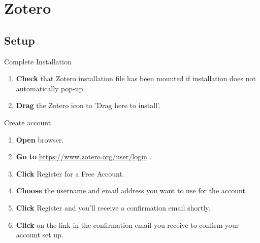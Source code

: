 \documentclass[10pt,a4paper]{article}
\begin{document}


\section{Zotero}
\subsection{Setup}
\begin{textbox}{Complete Installation}
 

  

\begin{enumerate}
\item \textbf{Check} that Zotero installation file has been mounted if installation does not automatically pop-up.
\item \textbf{Drag} the Zotero icon to 'Drag here to install'.
\end{enumerate}

\end{textbox}

\begin{textbox}{Create account}
 

  

\begin{enumerate}
\item \textbf{Open} browser.
\item \textbf{Go to}  \href{https://www.zotero.org/user/login}{https://www.zotero.org/user/login} .
\item \textbf{Click} Register for a Free Account.
\item \textbf{Choose} the username and email address you want to use for the account.
\item \textbf{Click} Register and you’ll receive a confirmation email shortly.
\item \textbf{Click} on the link in the confirmation email you receive to confirm your account set up.
\end{enumerate}

\end{textbox}
\end{document}
